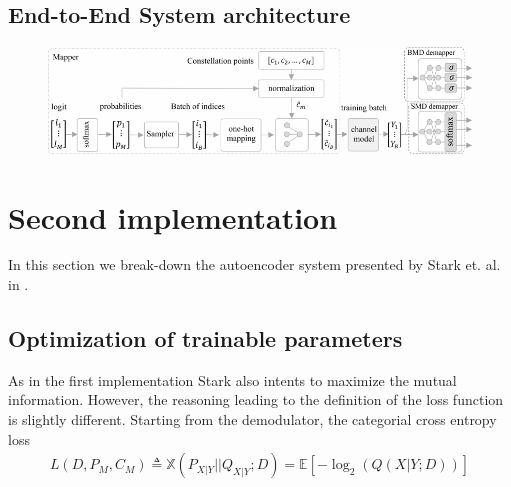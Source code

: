 \subsection{End-to-End System architecture}
\begin{figure}[h!]
\includegraphics[width=\textwidth]{figs/aref_diagram.png}
\centering
\end{figure}

\section{Second implementation}
In this section we break-down the autoencoder system presented by Stark et. al. in \cite{Stark}.
\subsection{Optimization of trainable parameters}
As in the first implementation Stark also intents to maximize the mutual information. However, the reasoning leading to the definition of the loss function is slightly different. Starting from the demodulator, the categorial cross entropy loss
\begin{align}
	L(D, P_M, C_M) \triangleq \mathbb{X}(P_{X|Y}||Q_{X|Y}; D) = \mathbb{E}\left[-\log_2(Q(X|Y;D))\right] 
\end{align}


